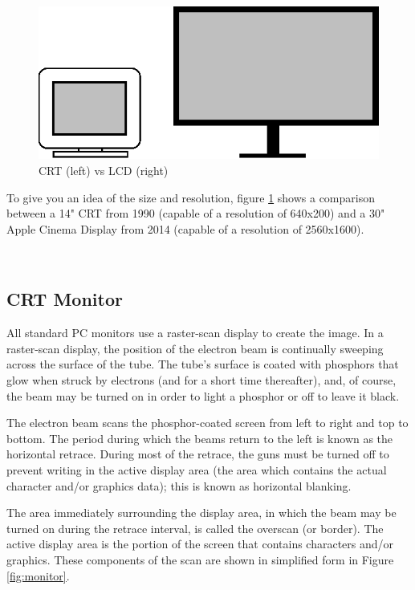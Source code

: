 \documentclass[book.tex]{subfiles}
\begin{document}
\begin{figure}[H]
\centering
\includegraphics[width=\textwidth]{imgs/drawings/crt_lcd.eps}
\caption{CRT (left) vs LCD (right)}
\label{fig:lcd_vs_crt}
\end{figure}
\par
  To give you an idea of the size and resolution, figure \ref{fig:lcd_vs_crt} shows a comparison between a 14" CRT from 1990 (capable of a resolution of 640x200) and a 30" Apple Cinema Display from 2014 (capable of a resolution of 2560x1600).\\
  \par
{}
\\

\subsection{CRT Monitor}
All standard PC monitors use a raster-scan display to create the image.
In a raster-scan display, the position of the electron beam is continually sweeping across the surface of the tube. The tube's surface is coated with phosphors that glow when struck by electrons (and for a short time thereafter), and, of course, the beam may be turned on in order to light a phosphor or off to leave it black.\\
\par

The electron beam scans the phosphor-coated screen from left to right and
top to bottom. The period during which the beams return to the left is known as
the horizontal retrace. During most of the retrace, the guns must be turned off
to prevent writing in the active display area (the area which contains the actual
character and/or graphics data); this is known as horizontal blanking.\\

\par
The area immediately surrounding the display area, in which the beam may be turned on
during the retrace interval, is called the overscan (or border). The active display
area is the portion of the screen that contains characters and/or graphics. These
components of the scan are shown in simplified form in Figure \ref{fig:monitor}.\\
\end{document}
